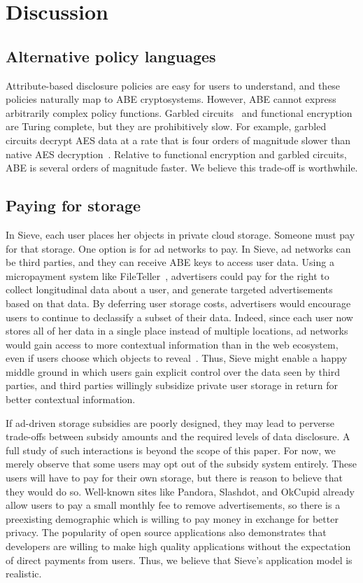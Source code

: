 \section{Discussion}
\label{sec:discussion}

\subsection{Alternative policy languages}
Attribute-based disclosure policies are easy
for users to understand, and these policies
naturally map to ABE cryptosystems. However,
ABE cannot express arbitrarily complex policy
functions. Garbled circuits~\cite{lindell2009proof}
and functional encryption~\cite{boneh2011functional}
are Turing complete, but they are prohibitively
slow. For example, garbled circuits decrypt
AES data at a rate that is four orders of
magnitude slower than native AES decryption~\cite{justGarble}.
Relative to functional encryption and garbled
circuits, ABE is several orders of magnitude
faster. We believe this trade-off is worthwhile.


\subsection{Paying for storage} 
In Sieve,
each user places her objects in private cloud
storage. Someone must pay for that storage.
One option is for ad networks to pay. In Sieve,
ad networks can be third parties, and they can
receive ABE keys to access user data. Using a
micropayment system like FileTeller~\cite{fileteller},
advertisers could pay for the right to collect
longitudinal data about a user, and generate
targeted advertisements based on that data.
By deferring user storage costs, advertisers
would encourage users to continue to declassify
a subset of their data. Indeed, since each user
now stores all of her data in a single place
instead of multiple locations, ad networks
would gain access to more contextual information
than in the web ecosystem, even if users choose
which objects to reveal~\cite{adnostic}. Thus,
Sieve might enable a happy middle ground in
which users gain explicit control over the data
seen by third parties, and third parties willingly
subsidize private user storage in return for
better contextual information.

If ad-driven storage subsidies are poorly
designed, they may lead to perverse trade-offs
between subsidy amounts and the required
levels of data disclosure. A full study of
such interactions is beyond the scope of
this paper. For now, we merely observe that
some users may opt out of the subsidy system
entirely. These users will have to pay for
their own storage, but there is reason to
believe that they would do so. Well-known
sites like Pandora, Slashdot, and OkCupid
already allow users to pay a small monthly
fee to remove advertisements, so there is a
preexisting demographic which is willing to
pay money in exchange for better privacy.
The popularity of open source applications
also demonstrates that developers are willing
to make high quality applications without the
expectation of direct payments from users.
Thus, we believe that Sieve's application
model is realistic.

